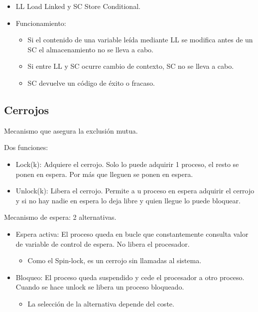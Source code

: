 \documentclass[12pt, twoside, openright]{report} %
\begin{document}
\begin{itemize}

	\item LL Load Linked y SC Store Conditional.
	\item Funcionamiento:

	      \begin{itemize}

		      \item Si el contenido de una variable leída mediante LL se modifica
		            antes de un SC el almacenamiento no se lleva a cabo.
		      \item Si entre LL y SC ocurre cambio de contexto, SC no se lleva a
		            cabo.
		      \item SC devuelve un código de éxito o fracaso.
	      \end{itemize}
\end{itemize}

\subsection{Cerrojos}



Mecanismo que asegura la exclusión mutua.

Dos funciones:

\begin{itemize}

	\item Lock(k): Adquiere el cerrojo. Solo lo puede adquirir 1 proceso,
	      el resto se ponen en espera. Por más que lleguen se ponen en
	      espera.
	\item Unlock(k): Libera el cerrojo. Permite a u proceso en espera
	      adquirir el cerrojo y si no hay nadie en espera lo deja libre y
	      quien llegue lo puede bloquear.
\end{itemize}

Mecanismo de espera: 2 alternativas.

\begin{itemize}

	\item Espera activa: El proceso queda en bucle que constantemente
	      consulta valor de variable de control de espera. No libera el
	      procesador.

	      \begin{itemize}

		      \item Como el Spin-lock, es un cerrojo sin llamadas al sistema.
	      \end{itemize}
	\item Bloqueo: El proceso queda suspendido y cede el procesador a otro
	      proceso. Cuando se hace unlock se libera un proceso bloqueado.

	      \begin{itemize}

		      \item La selección de la alternativa depende del coste.
	      \end{itemize}
\end{itemize}
\end{document}

